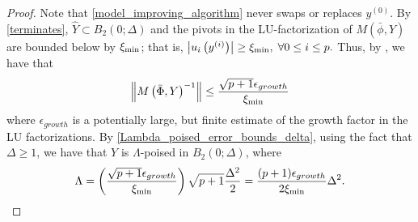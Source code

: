 \documentclass{article}
\begin{document}
\begin{proof}

Note that \cref{model_improving_algorithm} never swaps or replaces $y^{(0)}$.
By \cref{terminates},  $\hat Y \subset B_2(0;\Delta)$
and the pivots in the LU-factorization of $M(\bar{\phi},Y)$ are bounded below by $\xi_{\text{min}}$; that is,
$\left|u_i\left(y^{(i)}\right)\right| \ge \xi_{\text{min}}, \; \forall 0 \le i \le p.$
Thus, by 
\cite[Section 6.7, Exercise 3]{introduction_book}, 
 we have that 
\begin{align*}
\left\|M\left(\bar \Phi, Y\right)^{-1}\right\| \le \frac{\sqrt{p+1}\epsilon_{growth}}{\xi_{\text{min}}}
\end{align*}
where $\epsilon_{growth}$ is a potentially large, but finite estimate of the growth factor in the LU factorizations.   By  \cref{Lambda_poised_error_bounds_delta},  using the fact that $\Delta \ge 1$, we have that $Y$ is $\Lambda$-poised in $B_2(0;\Delta)$,  where 
\[\Lambda = \left(\frac{\sqrt{p+1}\epsilon_{growth}}{\xi_{\text{min}}}\right) \sqrt{p+1}  \frac{\Delta^2}{2} = \frac{(p+1) \epsilon_{growth}}{2\xi_{\text{min}}}\Delta^2.\]
%
%
%
%
\end{proof}

%
%
\end{document}
